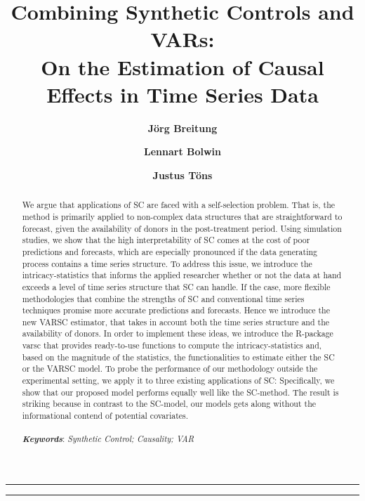 \documentclass[11pt]{article}
\author[a]{\textbf{Jörg Breitung}}
\author[b]{\textbf{Lennart Bolwin}}
\author[b]{\textbf{Justus Töns}}
\affil[a]{University of Cologne, Chair of Statistics and Econometrics}
\affil[b]{University of Cologne, Chair of Statistics and Econometrics \newline
	Supervised by Prof. Dr. Jörg Breitung
}
\title{\textbf{\huge Combining Synthetic Controls and VARs:}\\
	On the Estimation of Causal Effects in Time Series Data}
\date{}
\begin{document}
	\onehalfspacing
	\pagestyle{headings}	
	\newpage
	\setcounter{page}{1}
	\renewcommand{\thepage}{\arabic{page}}
	
	
	
		
	\setlength{\parskip}{0.5em}
	
	\maketitle
	
	\noindent\rule{15cm}{0.5pt}
	\begin{abstract}
		We argue that applications of \ac{SC} are faced with a self-selection problem. That is, the method is primarily applied to non-complex data structures that are straightforward to forecast, given the availability of donors in the post-treatment period. Using simulation  studies, we show that the high interpretability of \ac{SC} comes at the cost of poor predictions and forecasts, which are especially pronounced if the data generating process contains a time series structure. To address this issue, we introduce the intricacy-statistics that informs the applied researcher whether or not the data at hand exceeds a level of time series structure that \ac{SC} can handle. If the case, more flexible methodologies that combine the strengths of \ac{SC} and conventional time series techniques promise more accurate predictions and forecasts. Hence we introduce the new \ac{VARSC} estimator, that takes in account both the time series structure and the availability of donors. In order to implement these ideas, we introduce the R-package varsc that provides ready-to-use functions to compute the intricacy-statistics and, based on the magnitude of the statistics, the functionalities to estimate either the \ac{SC} or the \ac{VARSC} model. To probe the performance of our methodology outside the experimental setting, we apply it to three existing applications of \ac{SC}: Specifically, we show that our proposed model performs equally well like the SC-method. The result is striking because in contrast to the \ac{SC}-model, our models gets along without the informational contend of potential covariates. \\ \\
		
		\textbf{\textit{Keywords}}: \textit{Synthetic Control; Causality; VAR}
	\end{abstract}
	\noindent\rule{15cm}{0.4pt}
	
	
	\newpage
	\doublespacing
	
	\newpage
	\tableofcontents
	\newpage
	\listoffigures
	\newpage
	
	\newpage	
	
	\newpage
	
	\newpage	
	
	\newpage
	
	\newpage
	
	\newpage
	
	
	\newpage
	 
	
	
	\newpage
	
	
\end{document}
